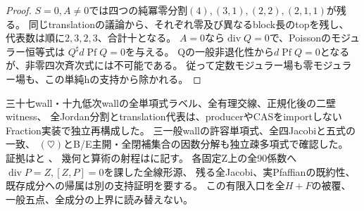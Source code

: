 \documentclass[a4paper,11pt]{ltjsarticle}
\theoremstyle{definition}
\begin{document}
\begin{proof}
$S=0,A\ne0$では四つの純冪零分割$(4),(3,1),(2,2),(2,1,1)$が残る。
同じtranslationの議論から、それぞれ零及び異なるblock長のtopを残し、
代表数は順に$2,3,2,3$、合計十となる。
$A=0$なら$\operatorname{div}Q=0$で、Poissonのモジュラー恒等式は
$Q^\sharp d\operatorname{Pf}Q=0$を与える。
Qの一般非退化性から$d\operatorname{Pf}Q=0$となるが、非零四次斉次式には不可能である。
従って定数モジュラー場も零モジュラー場も、この単純hの支持から除かれる。
\end{proof}

三十七wall・十九低次wallの全単項式ラベル、全有理交線、正規化後の二壁witness、
全Jordan分割とtranslation代表は、producerやCASをimportしないFraction実装で独立再構成した。
三一般wallの許容単項式、全四Jacobiと五式の一致、
$(\heartsuit)$とB/E主開・全閉補集合の因数分解も独立疎多項式で確認した。
証拠はと
、
幾何と算術の射程はに記す。
各固定Z上の全90係数へ$\operatorname{div}P=Z,[Z,P]=0$を課した全線形源、
残る全Jacobi、実Pfaffianの既約性、既存成分への帰属は別の支持証明を要する。
この有限入口を全$H+F$の被覆、一般五点、全成分の上界に読み替えない。
\end{document}
